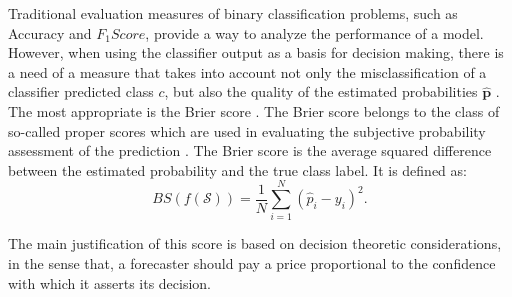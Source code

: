 Traditional evaluation measures of binary classification problems, such as Accuracy and 
$F_1Score$, provide a way to analyze the performance of a model. However, when using the classifier 
output as a basis for decision making, there is a need of a measure that takes into account not 
only the misclassification of a classifier predicted class $c$, but also the quality of the 
estimated probabilities $\mathbf{\hat p}$ \citep{cohen2004}. The most appropriate  is the Brier 
score \citep{brier1950}. The Brier score belongs to the class of so-called proper scores which are 
used in evaluating the subjective probability assessment of the prediction \citep{DeGroot1983}. The 
Brier score is the average squared difference between the estimated probability and the true class 
label. It is defined as:
\begin{equation}
  BS(f(\mathcal{S})) = \frac{1}{N} \sum_{i=1}^{N} (\hat p_i - y_i)^2.
\end{equation}

The main justification of this score is based on decision theoretic considerations, in the sense 
that, a forecaster should pay a price proportional to the confidence with which it asserts its 
decision.


\subsection*{}
